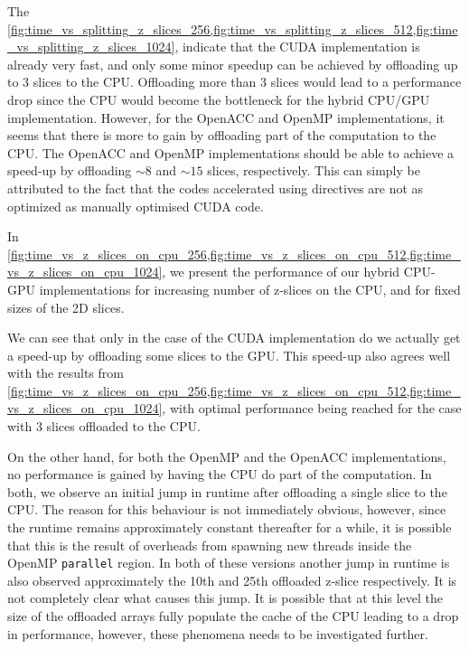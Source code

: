 The \cref{fig:time_vs_splitting_z_slices_256,fig:time_vs_splitting_z_slices_512,fig:time_vs_splitting_z_slices_1024}, indicate that the CUDA implementation is already very fast, and only some minor speedup can be achieved by offloading up to 3 slices to the CPU.
Offloading more than 3 slices would lead to a performance drop since the CPU would become the bottleneck for the hybrid CPU/GPU implementation.
However, for the OpenACC and OpenMP implementations, it seems that there is more to gain by offloading part of the computation to the CPU.
The OpenACC and OpenMP implementations should be able to achieve a speed-up by offloading $\sim8$ and $\sim15$ slices, respectively.
This can simply be attributed to the fact that the codes accelerated using directives are not as optimized as manually optimised CUDA code.  

In \cref{fig:time_vs_z_slices_on_cpu_256,fig:time_vs_z_slices_on_cpu_512,fig:time_vs_z_slices_on_cpu_1024}, we present the performance of our hybrid CPU-GPU implementations for increasing number of z-slices on the CPU, and for fixed sizes of the 2D slices.  





We can see that only in the case of the CUDA implementation do we actually get a speed-up by offloading some slices to the GPU.
This speed-up also agrees well with the results from \cref{fig:time_vs_z_slices_on_cpu_256,fig:time_vs_z_slices_on_cpu_512,fig:time_vs_z_slices_on_cpu_1024}, with optimal performance being reached for the case with 3 slices offloaded to the CPU.

On the other hand, for both the OpenMP and the OpenACC implementations, no performance is gained by having the CPU do part of the computation.
In both, we observe an initial jump in runtime after offloading a single slice to the CPU.
The reason for this behaviour is not immediately obvious, however, since the runtime remains approximately constant thereafter for a while, it is possible that this is the result of overheads from spawning new threads inside the OpenMP \texttt{parallel} region.
In both of these versions another jump in runtime is also observed approximately the 10th and 25th offloaded z-slice respectively. It is not completely clear what causes this jump. It is possible that at this level the size of the offloaded arrays fully populate the cache of the CPU leading to a drop in performance, however, these phenomena needs to be investigated further. 
